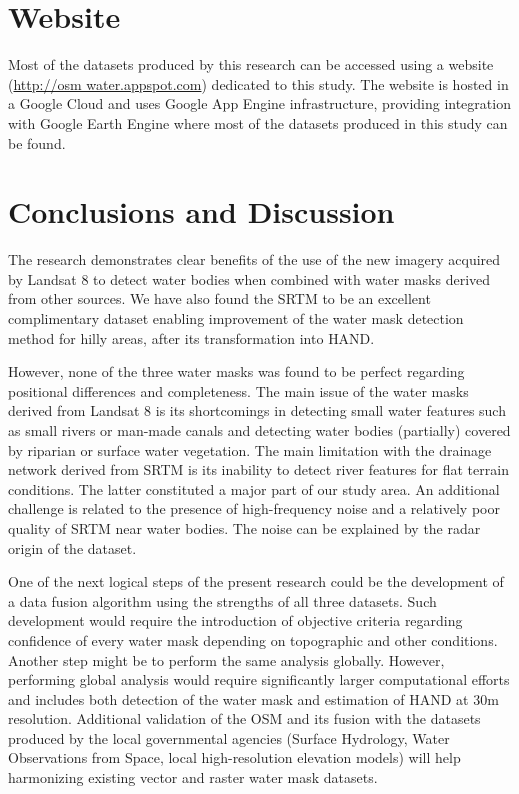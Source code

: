 \section{Website}

Most of the datasets produced by this research can be accessed using a website (\url{http://osm water.appspot.com}) dedicated to this study. The website is hosted in a Google Cloud and uses Google App Engine infrastructure, providing integration with Google Earth Engine where most of the datasets produced in this study can be found.

\section{Conclusions and Discussion}
The research demonstrates clear benefits of the use of the new imagery acquired by Landsat 8 to detect water bodies when combined with water masks derived from other sources. We have also found the \gls{SRTM} to be an excellent complimentary dataset enabling improvement of the water mask detection method for hilly areas, after its transformation into \gls{HAND}.

However, none of the three water masks was found to be perfect regarding positional differences and completeness. The main issue of the water masks derived from Landsat 8 is its shortcomings in detecting small water features such as small rivers or man-made canals and detecting water bodies (partially) covered by riparian or surface water vegetation. The main limitation with the drainage network derived from \gls{SRTM} is its inability to detect river features for flat terrain conditions. The latter constituted a major part of our study area. An additional challenge is related to the presence of high-frequency noise and a relatively poor quality of \gls{SRTM} near water bodies. The noise can be explained by the radar origin of the dataset. 

One of the next logical steps of the present research could be the development of a data fusion algorithm using the strengths of all three datasets. Such development would require the introduction of objective criteria regarding confidence of every water mask depending on topographic and other conditions. Another step might be to perform the same analysis globally. However, performing global analysis would require significantly larger computational efforts and includes both detection of the water mask and estimation of \gls{HAND} at 30m resolution. Additional validation of the OSM and its fusion with the datasets produced by the local governmental agencies (Surface Hydrology, Water Observations from Space, local high-resolution elevation models) will help harmonizing existing vector and raster water mask datasets.


